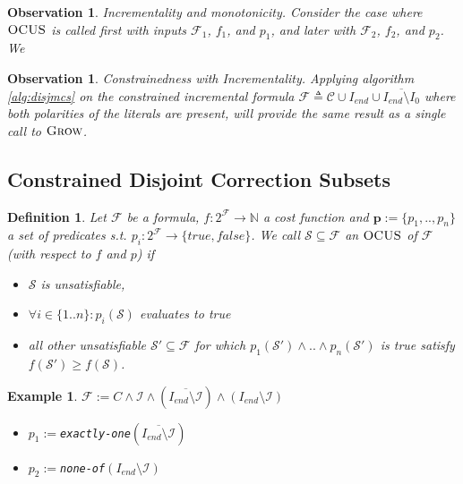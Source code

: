 \documentclass[twoside,11pt]{article}
\newcommand\m[1]{\mathcal{#1}}
\newtheorem{definition}[thm]{Definition}
\newtheorem{example}[ex]{Example}
\newtheorem{observation}[obs]{Observation}
\newcommand\Iend{\ensuremath{I_\mathit{end} }\xspace}
\newcommand\formula{\ensuremath{\m{F} }\xspace}
\newcommand\mm[1]{\ensuremath{#1}\xspace}
\newcommand\call[1]{\mm{\textsc{#1}}}
\newcommand\grow{\mm{\call{Grow}}}
\newcommand\comus{\mm{\call{OCUS}}}
\begin{document}
\begin{observation}\emph{Incrementality and monotonicity.}  Consider the case where \comus is called first with inputs $\formula_1$, $f_1$, and $p_1$, and later with $\formula_2$, $f_2$, and $p_2$. We 
\end{observation}

\begin{observation}
\emph{Constrainedness with Incrementality.}  Applying algorithm \ref{alg:disjmcs} on the constrained incremental formula $\formula \triangleq \m{C}\cup \Iend \cup \overline{\Iend \setminus I_0}$ where both polarities of the literals are present, will provide the same result as a single call to \grow. 
\end{observation}

\clearpage
\subsection{Constrained Disjoint Correction Subsets}
\begin{definition}
Let $\m{F}$ be a formula, $f: 2^{\m{F}} \rightarrow \mathbb{N}$ a cost function and $\textbf{p} := \{p_1, ..,p_n\}$ a set of predicates s.t. $p_i: 2^{\m{F}} \rightarrow \{true, false\}$. We call 
$\m{S} \subseteq \formula$ an \comus of \formula (with respect to $f$ and $p$) if \begin{itemize}                                      
\item $\m{S}$ is unsatisfiable,
\item $\forall i \in \{1 ..n\} : p_i(\m{S})$ evaluates to true  
\item all other unsatisfiable $\m{S}'\subseteq \formula$ for which $p_1(\m{S}') \wedge .. \wedge p_n(\m{S}')$ is true satisfy $f(\m{S}')\geq f(\m{S})$.
\end{itemize}
\end{definition}
\begin{example}  $\formula := C \wedge \m{I} \wedge (\overline{\Iend\setminus \m{I}}) \wedge (\Iend\setminus \m{I}) $
\begin{itemize}                                      
\item $p_1 := $\texttt{exactly-one}$(\overline{\Iend\setminus \m{I}})$
\item $p_2 := $\texttt{none-of}$(\Iend\setminus \m{I})$
\end{itemize}
\end{example}
\clearpage
\end{document}
